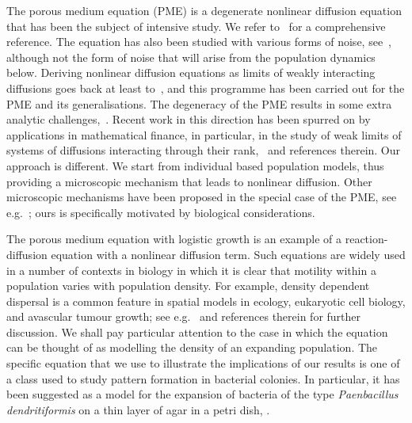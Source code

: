 \documentclass[12pt]{article}
\begin{document}
The porous medium equation (PME)
is a degenerate nonlinear diffusion equation that
has been the subject of intensive study. We refer to~\cite{vazquez:2007} for 
a comprehensive reference. The equation has also been studied with various
forms of noise, see~\cite{barbu/daprato/roeckner:2016}, although not the 
form of noise that will arise from the population dynamics below. 
Deriving nonlinear diffusion equations as limits of weakly interacting 
diffusions goes back at least to~\cite{mckean:1967}, and this 
programme has been
carried out for the PME and its generalisations. 
The degeneracy of the PME
results in some extra analytic
challenges,~\cite{jourdain:2000}.
Recent work in this 
direction has been spurred on by applications
in mathematical finance, %
in particular, in the study of weak limits of systems
of diffusions interacting through their 
rank,~\cite{dembo/shkolnikov/varadhan/zeitouni:2016, jourdain/reygner:2013}
and references therein.
Our approach is different.
We start from individual
based population models, thus providing a microscopic mechanism that leads to 
nonlinear diffusion.
Other microscopic mechanisms have been proposed in the special case of the
PME, see 
e.g.~\cite{feng/iscoe/seppalainen:1997, oelschlaeger:1990}; ours
is specifically motivated by biological considerations.


The porous medium equation with logistic growth is an example of a
reaction-diffusion equation with a nonlinear diffusion term.
Such equations are widely used in a number of contexts in biology in which
it is clear that motility within a population varies with population density.
For example, density dependent dispersal is a common feature in spatial
models in ecology, eukaryotic cell biology, and avascular tumour growth;
see e.g.~\cite{sherratt:2010} and references therein for further discussion. 
We shall pay particular attention to the case in which the equation can be 
thought of as modelling the density of an expanding population. 
The specific equation that we use to illustrate the implications of
our results is one of a class used to study pattern formation in 
bacterial colonies. In particular, it has been suggested as a model for
the expansion of bacteria of the type {\em Paenbacillus dendritiformis} on
a thin layer of agar in a petri dish, 
\cite{cohen/golding/kozlovsky/benjacob/ron:1999}. 
\end{document}

